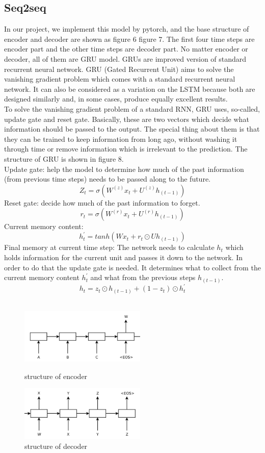 \documentclass{article}
\begin{document}
\subsection{Seq2seq}
In our project, we implement this model by pytorch, and the base structure of encoder and decoder are shown as figure 6 figure 7. The first four time steps are encoder part and the other time steps are decoder part. No matter encoder or decoder, all of them are GRU model. GRUs are improved version of standard recurrent neural network. GRU (Gated Recurrent Unit) aims to solve the vanishing gradient problem which comes with a standard recurrent neural network. It can also be considered as a variation on the LSTM because both are designed similarly and, in some cases, produce equally excellent results. \\[2]
To solve the vanishing gradient problem of a standard RNN, GRU uses, so-called, update gate and reset gate. Basically, these are two vectors which decide what information should be passed to the output. The special thing about them is that they can be trained to keep information from long ago, without washing it through time or remove information which is irrelevant to the prediction. The structure of GRU is shown in figure 8.\\[2]
Update gate: help the model to determine how much of the past information (from previous time steps) needs to be passed along to the future.
$$Z_{t} = \sigma (W^{(z)}x_t + U^{(z)}h_{(t-1)})$$
Reset gate: decide how much of the past information to forget.
$$r_t = \sigma (W^{(r)}x_t + U^{(r)}h_{(t-1)})$$
Current memory content: 
$$h_t^{'} = tanh(Wx_t + r_t\odot Uh_{(t-1)})$$
Final memory at current time step: The network needs to calculate $h_t$ which holds information for the current unit and passes it down to the network. In order to do that the update gate is needed. It determines what to collect from the current memory content $h_t^{'}$ and what from the previous steps $h_(t-1)$.
$$h_t = z_t \odot h_{(t-1)} +(1-z_t)\odot h_t^{'}$$\\
\begin{figure}[h]
\centering
\begin{minipage}[t]{0.48\textwidth}
\centering
\includegraphics[width=6cm]{encoder.png}
\caption{structure of encoder}
\end{minipage}
\begin{minipage}[t]{0.48\textwidth}
\centering
\includegraphics[width=6cm]{decoder.png}
\caption{structure of decoder}
\end{minipage}
\end{figure}\\
\end{document}
